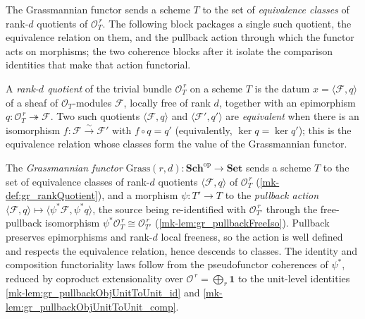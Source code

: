 The Grassmannian functor sends a scheme \(T\) to the set of \emph{equivalence classes} of
rank-\(d\) quotients of \(\mathcal{O}_T^{\,r}\). The following block packages a single such
quotient, the equivalence relation on them, and the pullback action through which the
functor acts on morphisms; the two coherence blocks after it isolate the comparison
identities that make that action functorial.

\begin{definition}\label{mk-def:gr_rankQuotient}
  \leanok

  A \emph{rank-\(d\) quotient} of the trivial bundle \(\mathcal{O}_T^{\,r}\) on a scheme
  \(T\) is the datum \(x = \langle \mathcal{F}, q\rangle\) of a sheaf of
  \(\mathcal{O}_T\)-modules \(\mathcal{F}\), locally free of rank \(d\), together with an
  epimorphism \(q : \mathcal{O}_T^{\,r} \twoheadrightarrow \mathcal{F}\). Two such quotients
  \(\langle \mathcal{F}, q\rangle\) and \(\langle \mathcal{F}', q'\rangle\) are
  \emph{equivalent} when there is an isomorphism \(f : \mathcal{F} \xrightarrow{\sim}
  \mathcal{F}'\) with \(f \circ q = q'\) (equivalently, \(\ker q = \ker q'\)); this is the
  equivalence relation whose classes form the value of the Grassmannian functor.
\end{definition}

\begin{definition}\label{mk-def:grassmannian_functor}
  \leanok

  The \emph{Grassmannian functor} \(\mathrm{Grass}(r,d) : \mathbf{Sch}^{\mathrm{op}} \to
  \mathbf{Set}\) sends a scheme \(T\) to the set of equivalence classes of rank-\(d\)
  quotients \(\langle \mathcal{F}, q\rangle\) of \(\mathcal{O}_T^{\,r}\)
  (\ref{mk-def:gr_rankQuotient}), and a morphism \(\psi : T' \to T\) to the \emph{pullback
  action} \(\langle \mathcal{F}, q\rangle \mapsto \langle \psi^{*}\mathcal{F}, \psi^{*}q\rangle\),
  the source being re-identified with \(\mathcal{O}_{T'}^{\,r}\) through the free-pullback
  isomorphism \(\psi^{*}\mathcal{O}_T^{\,r} \cong \mathcal{O}_{T'}^{\,r}\)
  (\ref{mk-lem:gr_pullbackFreeIso}). Pullback preserves epimorphisms and rank-\(d\) local
  freeness, so the action is well defined and respects the equivalence relation, hence
  descends to classes. The identity and composition functoriality laws follow from the
  pseudofunctor coherences of \(\psi^{*}\), reduced by coproduct extensionality over
  \(\mathcal{O}^{\,r} = \bigoplus_r \mathbf{1}\) to the unit-level identities
  \ref{mk-lem:gr_pullbackObjUnitToUnit_id} and \ref{mk-lem:gr_pullbackObjUnitToUnit_comp}.
\end{definition}


